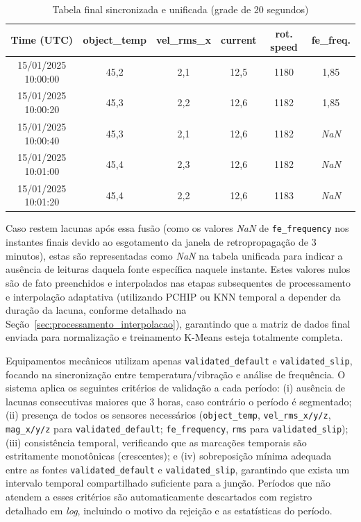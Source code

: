 \begin{table}[H]
    \centering
    \caption{Tabela final sincronizada e unificada (grade de 20 segundos)}
    \label{tab:exemplo_sincronizado}
    \begin{tabular}{cccccc}
        \hline
        \textbf{Time (UTC)} & \textbf{object\_temp} & \textbf{vel\_rms\_x} & \textbf{current} & \textbf{rot. speed} & \textbf{fe\_freq.} \\
        \hline
        15/01/2025 10:00:00 & 45,2 & 2,1 & 12,5 & 1180 & 1,85 \\
        15/01/2025 10:00:20 & 45,3 & 2,2 & 12,6 & 1182 & 1,85 \\
        15/01/2025 10:00:40 & 45,3 & 2,1 & 12,6 & 1182 & \textit{NaN} \\
        15/01/2025 10:01:00 & 45,4 & 2,3 & 12,6 & 1182 & \textit{NaN} \\
        15/01/2025 10:01:20 & 45,4 & 2,2 & 12,6 & 1183 & \textit{NaN} \\
        \hline
    \end{tabular}
\end{table}

Caso restem lacunas após essa fusão (como os valores \textit{NaN} de \texttt{fe\_frequency} nos instantes finais devido ao esgotamento da janela de retropropagação de 3 minutos), estas são representadas como \textit{NaN} na tabela unificada para indicar a ausência de leituras daquela fonte específica naquele instante. Estes valores nulos são de fato preenchidos e interpolados nas etapas subsequentes de processamento e interpolação adaptativa (utilizando PCHIP ou KNN temporal a depender da duração da lacuna, conforme detalhado na Seção~\ref{sec:processamento_interpolacao}), garantindo que a matriz de dados final enviada para normalização e treinamento K-Means esteja totalmente completa.

Equipamentos mecânicos utilizam apenas \texttt{validated\_\allowbreak default} e \texttt{validated\_\allowbreak slip}, focando na sincronização entre temperatura/vibração e análise de frequência. O sistema aplica os seguintes critérios de validação a cada período: (i) ausência de lacunas consecutivas maiores que 3 horas, caso contrário o período é segmentado; (ii) presença de todos os sensores necessários (\texttt{object\_temp}, \texttt{vel\_rms\_x/y/z}, \texttt{mag\_x/y/z} para \texttt{validated\_\allowbreak default}; \texttt{fe\_\allowbreak frequency}, \texttt{rms} para \texttt{validated\_\allowbreak slip}); (iii) consistência temporal, verificando que as marcações temporais são estritamente monotônicas (crescentes); e (iv) sobreposição mínima adequada entre as fontes \texttt{validated\_\allowbreak default} e \texttt{validated\_\allowbreak slip}, garantindo que exista um intervalo temporal compartilhado suficiente para a junção. Períodos que não atendem a esses critérios são automaticamente descartados com registro detalhado em \textit{log}, incluindo o motivo da rejeição e as estatísticas do período.

